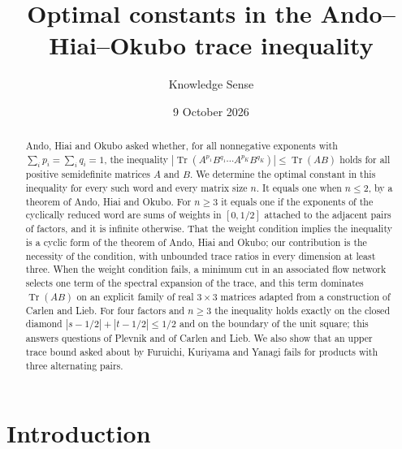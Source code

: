 \documentclass{amsart}
\theoremstyle{definition}
\theoremstyle{remark}
\numberwithin{equation}{section}
\newcommand{\Tr}{\operatorname{Tr}}
\begin{document}
\title[The Ando--Hiai--Okubo trace inequality]{Optimal constants in the Ando--Hiai--Okubo trace inequality}

\author{Knowledge Sense}
\address{Knowledge Sense}

\date{9 October 2026}



\begin{abstract}
Ando, Hiai and Okubo asked whether, for all nonnegative exponents with $\sum_ip_i=\sum_iq_i=1$, the inequality $|\Tr(A^{p_1}B^{q_1}\cdots A^{p_K}B^{q_K})|\le\Tr(AB)$ holds for all positive semidefinite matrices $A$ and $B$. We determine the optimal constant in this inequality for every such word and every matrix size $n$. It equals one when $n\le 2$, by a theorem of Ando, Hiai and Okubo. For $n\ge 3$ it equals one if the exponents of the cyclically reduced word are sums of weights in $[0,1/2]$ attached to the adjacent pairs of factors, and it is infinite otherwise. That the weight condition implies the inequality is a cyclic form of the theorem of Ando, Hiai and Okubo; our contribution is the necessity of the condition, with unbounded trace ratios in every dimension at least three. When the weight condition fails, a minimum cut in an associated flow network selects one term of the spectral expansion of the trace, and this term dominates $\Tr(AB)$ on an explicit family of real $3\times 3$ matrices adapted from a construction of Carlen and Lieb. For four factors and $n\ge 3$ the inequality holds exactly on the closed diamond $|s-1/2|+|t-1/2|\le 1/2$ and on the boundary of the unit square; this answers questions of Plevnik and of Carlen and Lieb. We also show that an upper trace bound asked about by Furuichi, Kuriyama and Yanagi fails for products with three alternating pairs.
\end{abstract}

\maketitle

\section{Introduction}
\end{document}
